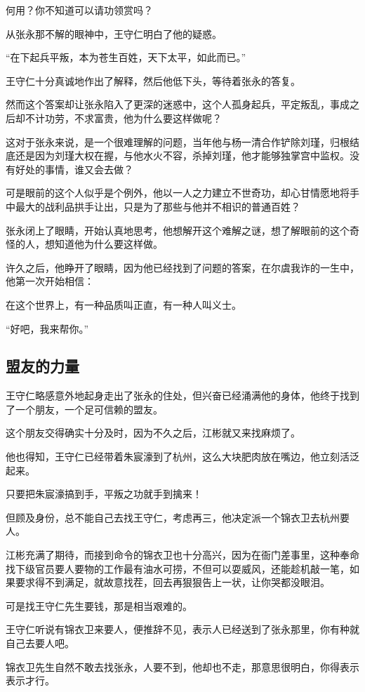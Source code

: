 \begin{multicols}{\theparacolNo}
何用？你不知道可以请功领赏吗？

从张永那不解的眼神中，王守仁明白了他的疑惑。

“在下起兵平叛，本为苍生百姓，天下太平，如此而已。”

王守仁十分真诚地作出了解释，然后他低下头，等待着张永的答复。

然而这个答案却让张永陷入了更深的迷惑中，这个人孤身起兵，平定叛乱，事成之后却不计功劳，不求富贵，他为什么要这样做呢？

这对于张永来说，是一个很难理解的问题，当年他与杨一清合作铲除刘瑾，归根结底还是因为刘瑾大权在握，与他水火不容，杀掉刘瑾，他才能够独掌宫中监权。没有好处的事情，谁又会去做？

可是眼前的这个人似乎是个例外，他以一人之力建立不世奇功，却心甘情愿地将手中最大的战利品拱手让出，只是为了那些与他并不相识的普通百姓？

张永闭上了眼睛，开始认真地思考，他想解开这个难解之谜，想了解眼前的这个奇怪的人，想知道他为什么要这样做。

许久之后，他睁开了眼睛，因为他已经找到了问题的答案，在尔虞我诈的一生中，他第一次开始相信：

在这个世界上，有一种品质叫正直，有一种人叫义士。

“好吧，我来帮你。”

\subsection{盟友的力量}
王守仁略感意外地起身走出了张永的住处，但兴奋已经涌满他的身体，他终于找到了一个朋友，一个足可信赖的盟友。

这个朋友交得确实十分及时，因为不久之后，江彬就又来找麻烦了。

他也得知，王守仁已经带着朱宸濠到了杭州，这么大块肥肉放在嘴边，他立刻活泛起来。

只要把朱宸濠搞到手，平叛之功就手到擒来！

但顾及身份，总不能自己去找王守仁，考虑再三，他决定派一个锦衣卫去杭州要人。

江彬充满了期待，而接到命令的锦衣卫也十分高兴，因为在衙门差事里，这种奉命找下级官员要人要物的工作最有油水可捞，不但可以耍威风，还能趁机敲一笔，如果要求得不到满足，就故意找茬，回去再狠狠告上一状，让你哭都没眼泪。

可是找王守仁先生要钱，那是相当艰难的。

王守仁听说有锦衣卫来要人，便推辞不见，表示人已经送到了张永那里，你有种就自己去要人吧。

锦衣卫先生自然不敢去找张永，人要不到，他却也不走，那意思很明白，你得表示表示才行。


\end{multicols}

